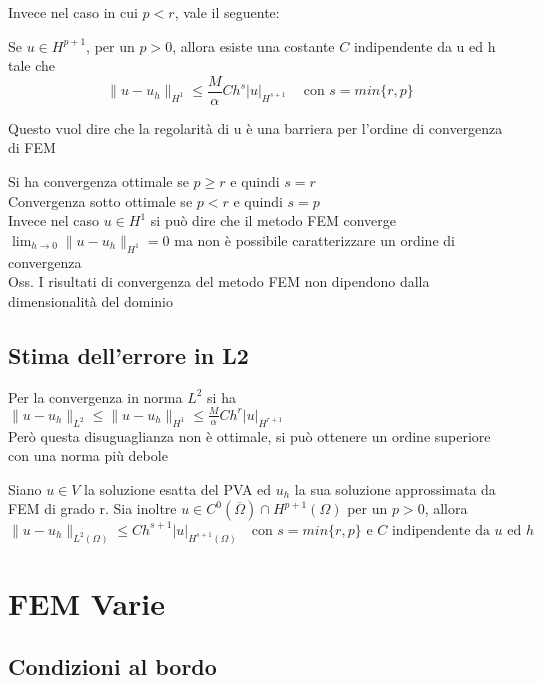 \documentclass{article}
\newcommand{\om}{\Omega}
\begin{document}
Invece nel caso in cui $p<r$, vale il seguente:

\begin{teo}
    Se $u\in H^{p+1}$, per un $p>0$, allora esiste una costante $C$ indipendente da u ed h tale che
    \[
    \|u-u_h\|_{H^1} \le \frac{M}{\alpha} C h^s |u|_{H^{s+1}} \ \ \ \ \text{ con } s=min\{r,p\}
    \]
\end{teo}

Questo vuol dire che la regolarità di u è una barriera per l'ordine di convergenza di FEM


Si ha convergenza ottimale se $p\ge r$ e quindi $s=r$\\
Convergenza sotto ottimale se $p<r$ e quindi $s=p$\\
Invece nel caso $u\in H^1$ si può dire che il metodo FEM converge $\displaystyle\lim_{h\to0} \|u-u_h\|_{H^1}=0$ ma non è possibile caratterizzare un ordine di convergenza\\

Oss. I risultati di convergenza del metodo FEM non dipendono dalla dimensionalità del dominio\\ 

\subsection{Stima dell'errore in L2}

Per la convergenza in norma $L^2$ si ha $\|u-u_h\|_{L^2}\le \|u-u_h\|_{H^1}\le \frac{M}{\alpha} C h^r|u|_{H^{r+1}}$\\
Però questa disuguaglianza non è ottimale, si può ottenere un ordine superiore con una norma più debole\\

\begin{teo}
    Siano $u\in V$ la soluzione esatta del PVA ed $u_h$ la sua soluzione approssimata da FEM di grado r. Sia inoltre $u\in C^0(\overline{\om})\cap H^{p+1}(\om)$ per un $p>0$, allora
    \[
    \|u-u_h\|_{L^2(\om)}\le C h^{s+1}|u|_{H^{s+1}(\om)} \ \ \ \text{ con } s=min\{r,p\} \text{ e } C \text{ indipendente da $u$ ed $h$}
    \]
\end{teo}

\newpage

\section{FEM Varie}

\subsection{Condizioni al bordo}
\end{document}
